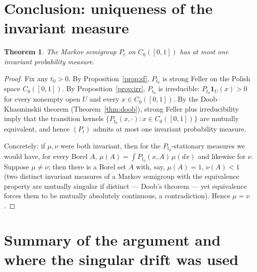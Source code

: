 \documentclass[11pt]{article}
\newtheorem{theorem}{Theorem}
\newcommand{\C}{C_0([0,1])}
\begin{document}
\section{Conclusion: uniqueness of the invariant measure}

\begin{theorem}\label{thm:main}
The Markov semigroup $P_t$ on $\C$ has at most one invariant probability
measure.
\end{theorem}

\begin{proof}
Fix any $t_0>0$. By Proposition~\ref{prop:sf}, $P_{t_0}$ is strong Feller on the
Polish space $\C$. By Proposition~\ref{prop:irr}, $P_{t_0}$ is irreducible:
$P_{t_0}\mathbf 1_U(x)>0$ for every nonempty open $U$ and every $x\in\C$. By the
Doob--Khasminskii theorem (Theorem~\ref{thm:doob}), strong Feller plus
irreducibility imply that the transition kernels $\{P_{t_0}(x,\cdot):x\in\C\}$
are mutually equivalent, and hence $(P_t)$ admits at most one invariant
probability measure.

Concretely: if $\mu,\nu$ were both invariant, then for the $P_{t_0}$-stationary
measures we would have, for every Borel $A$,
$\mu(A)=\int P_{t_0}(x,A)\,\mu(dx)$ and likewise for $\nu$. Suppose
$\mu\ne\nu$; then there is a Borel set $A$ with, say, $\mu(A)=1$, $\nu(A)<1$
(two distinct invariant measures of a Markov semigroup with the equivalence
property are mutually singular if distinct — Doob's theorem — yet equivalence
forces them to be mutually absolutely continuous, a contradiction). Hence
$\mu=\nu$.
\end{proof}

\section{Summary of the argument and where the singular drift was used}
\end{document}
